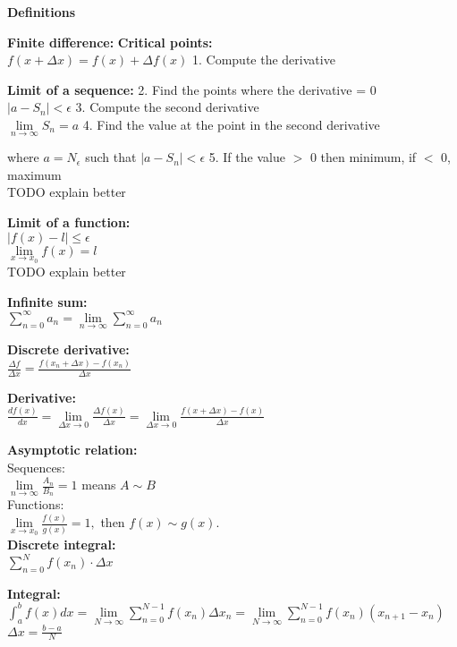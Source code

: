 \documentclass[12pt,a4paper]{report}
\begin{document}
	
	\begin{center}\textbf{Definitions}\end{center}
	
	\textbf{Finite difference:} 									\hfill \textbf{Critical points:}\\
	$f(x + \Delta x) = f(x) + \Delta f(x)$ 							\hfill 1. Compute the derivative

	\textbf{Limit of a sequence:}									\hfill 2. Find the points where the derivative = 0\\
	$|a - S_n| < \epsilon$											\hfill 3. Compute the second derivative\\
	$\lim\limits_{n \to \infty} S_n = a$							\hfill 4. Find the value at the point in the second derivative
	
	where $a = N_\epsilon$ such that $|a - S_n| < \epsilon$			\hfill 5. If the value $>$ 0 then minimum, if $<$ 0, maximum\\
	TODO explain better

	\textbf{Limit of a function:}\\
	$|f(x) - l| \leq \epsilon$\\
	$\lim\limits_{x \to x_0} f(x) = l$\\
	TODO explain better
	
	\textbf{Infinite sum:}\\
	$\sum_{n = 0}^{\infty} a_n = \lim\limits_{n \to \infty} \sum_{n = 0}^{\infty} a_n$
	
	\textbf{Discrete derivative:}\\
	$\frac{\Delta f}{\Delta x} = \frac{f(x_n + \Delta x) - f(x_n)}{\Delta x}$
	
	\textbf{Derivative:}\\
	$\frac{df(x)}{dx} = \lim\limits_{\Delta x \to 0} \frac{\Delta f(x)}{\Delta x} = \lim\limits_{\Delta x \to 0} \frac{f(x + \Delta x) - f(x)}{\Delta x}$
	
	\textbf{Asymptotic relation:}\\
	Sequences:\\
	$\lim\limits_{n \to \infty} \frac{A_n}{B_n} = 1$ means $A \sim B$\\
	Functions:\\
	$\lim\limits_{x \to x_0} \frac{f(x)}{g(x)} = 1,$ then $f(x) \sim g(x).$\\
	
	\textbf{Discrete integral:}\\
	$\sum_{n = 0}^{N} f(x_n) \cdot \Delta x$
	
	\textbf{Integral:}\\
	$\int_{a}^{b} f(x) dx = \lim\limits_{N \to \infty} \sum_{n = 0}^{N - 1} f(x_n) \Delta x_n = \lim\limits_{N \to \infty} \sum_{n = 0}^{N - 1} f(x_n)(x_{n+1} - x_n)$\\
	$\Delta x = \frac{b - a}{N}$
	
\end{document}
